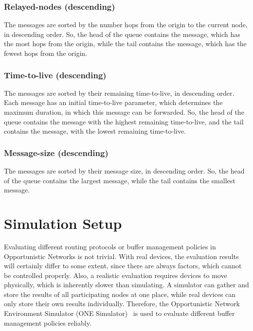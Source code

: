 \documentclass[conference,10pt,letterpaper,final]{IEEEtran}
\begin{document}
\vspace{0.2cm}
\subsubsection{Relayed-nodes (descending)}
The messages are sorted by the number hops from the origin to the current node, in descending order.
So, the head of the queue contains the message, which has the most hops from the origin, while the tail contains the message, which has the fewest hops from the origin.

\vspace{0.2cm}
\subsubsection{Time-to-live (descending)}
The messages are sorted by their remaining time-to-live, in descending order.
Each message has an initial time-to-live parameter, which determines the maximum duration, in which this message can be forwarded.
So, the head of the queue contains the message with the highest remaining time-to-live, and the tail contains the message, with the lowest remaining time-to-live.

\vspace{0.2cm}
\subsubsection{Message-size (descending)}
The messages are sorted by their message size, in descending order.
So, the head of the queue contains the largest message, while the tail contains the smallest message.


\section{Simulation Setup}
\label{sec:simsetup}

Evaluating different routing protocols or buffer management policies in Opportunistic Networks is not trivial.
With real devices, the evaluation results will certainly differ to some extent, since there are always factors, which cannot be controlled properly.
Also, a realistic evaluation requires devices to move physically, which is inherently slower than simulating.
A simulator can gather and store the results of all participating nodes at one place, while real devices can only store their own results individually.
Therefore, the Opportunistic Network Environment Simulator (ONE Simulator)~\cite{onesim} is used to evaluate different buffer management policies reliably.
\end{document}
